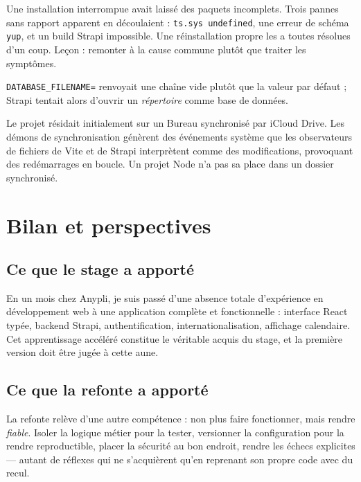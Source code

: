 \documentclass[11pt,a4paper]{report}
\begin{document}
\begin{description}[style=nextline,leftmargin=0.6cm]
  \item[Un cache de paquets corrompu] Une installation interrompue avait laissé
        des paquets incomplets. Trois pannes sans rapport apparent en découlaient :
        \texttt{ts.sys undefined}, une erreur de schéma \texttt{yup}, et un build
        Strapi impossible. Une réinstallation propre les a toutes résolues d'un
        coup. Leçon : remonter à la cause commune plutôt que traiter les symptômes.
  \item[Une variable d'environnement vide] \texttt{DATABASE\_FILENAME=} renvoyait
        une chaîne vide plutôt que la valeur par défaut ; Strapi tentait alors
        d'ouvrir un \emph{répertoire} comme base de données.
  \item[Un dossier synchronisé] Le projet résidait initialement sur un Bureau
        synchronisé par iCloud Drive. Les démons de synchronisation génèrent des
        événements système que les observateurs de fichiers de Vite et de Strapi
        interprètent comme des modifications, provoquant des redémarrages en
        boucle. Un projet Node n'a pas sa place dans un dossier synchronisé.
\end{description}

\chapter{Bilan et perspectives}

\section{Ce que le stage a apporté}

En un mois chez Anypli, je suis passé d'une absence totale d'expérience en
développement web à une application complète et fonctionnelle : interface React
typée, backend Strapi, authentification, internationalisation, affichage
calendaire. Cet apprentissage accéléré constitue le véritable acquis du stage, et
la première version doit être jugée à cette aune.

\section{Ce que la refonte a apporté}

La refonte relève d'une autre compétence : non plus faire fonctionner, mais rendre
\emph{fiable}. Isoler la logique métier pour la tester, versionner la
configuration pour la rendre reproductible, placer la sécurité au bon endroit,
rendre les échecs explicites --- autant de réflexes qui ne s'acquièrent qu'en
reprenant son propre code avec du recul.
\end{document}
